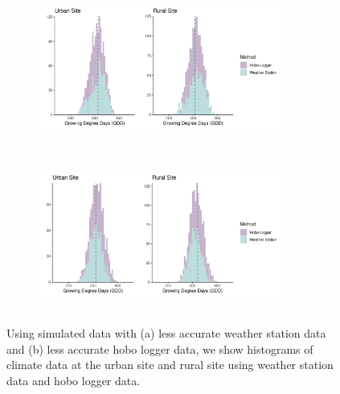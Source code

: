 \documentclass{article}\usepackage[]{graphicx}\usepackage[]{color}
\begin{document}
\begin{figure}[H]
  \begin{subfigure}{.5\textwidth}
    \caption{}
    \centering
    \includegraphics[height=5cm, width=8cm]{..//analyses/figures/gdd_sites_noisyws.pdf}
    \label{fig:gddnoisyws}
    \end{subfigure}
  \begin{subfigure}{.5\textwidth}
      \caption{}
      \centering
      \includegraphics[height=5cm, width=8cm]{..//analyses/figures/gdd_sites_noisyhobo.pdf}
    \label{fig:gddnoisyhobo}
    \end{subfigure}
\caption{ Using simulated data with (a) less accurate weather station data and (b) less accurate hobo logger data, we show histograms of climate data at the urban site and rural site using weather station data and hobo logger data.}
\label{fig:hists}
\end{figure}
\end{document}
